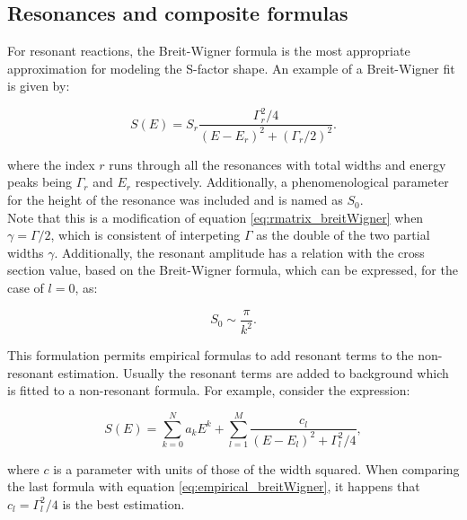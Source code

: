 \documentclass[openany]{book}
\begin{document}
\subsection{Resonances and composite formulas} \label{sub:empirical_resonances}


For resonant reactions, the Breit-Wigner formula is the most appropriate approximation for modeling the S-factor shape. An example of a Breit-Wigner fit is given by: 

\begin{equation} \label{eq:empirical_breitWigner}
	S(E) = S_r \frac{\Gamma^2_r/4}{(E-E_r)^2 + (\Gamma_r/2)^2}.
\end{equation}

where the index $r$ runs through all the resonances with total widths and energy peaks being $\Gamma_r$ and $E_r$ respectively. Additionally, a phenomenological parameter for the height of the resonance was included and is named as $S_0$. \\

 Note that this is a modification of equation \ref{eq:rmatrix_breitWigner} when $\gamma = \Gamma/2$, which is consistent of interpeting $\Gamma$ as the double of the two partial widths $\gamma$. Additionally, the resonant amplitude has a relation with the cross section value, based on the Breit-Wigner formula, which can be expressed, for the case of $l = 0$, as: 
 
 \begin{equation} \label{eq:empirical_breitWigner_S0}
 	S_0 \sim  \frac{\pi}{k^2}. 
 \end{equation}

This formulation permits empirical formulas to add resonant terms to the non-resonant estimation. Usually the resonant terms are added to background which is fitted to a non-resonant formula. For example, consider the expression: 

\begin{equation}  \label{eq:empirical_hybridPolynomial}
	S(E) =  \sum _{k = 0}^{N} {a_kE^k} + \sum_{l = 1}^{M} {\frac{c_l}{(E - E_l)^2 + \Gamma_l^2/4}},
\end{equation}

where $c$ is a parameter with units of those of the width squared. When comparing the last formula with equation \ref{eq:empirical_breitWigner}, it happens that $c_l = \Gamma^2_l/4$ is the best estimation. \\
\end{document}
